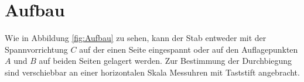 \section{Aufbau}
\label{sec:Aufbau}
Wie in Abbildung \ref{fig:Aufbau} zu sehen, kann der Stab entweder mit der Spannvorrichtung $C$ auf der einen Seite eingespannt oder auf den Auflagepunkten $A$ und $B$ auf beiden Seiten gelagert werden.
Zur Bestimmung der Durchbiegung sind verschiebbar an einer horizontalen Skala Messuhren mit Taststift angebracht.
